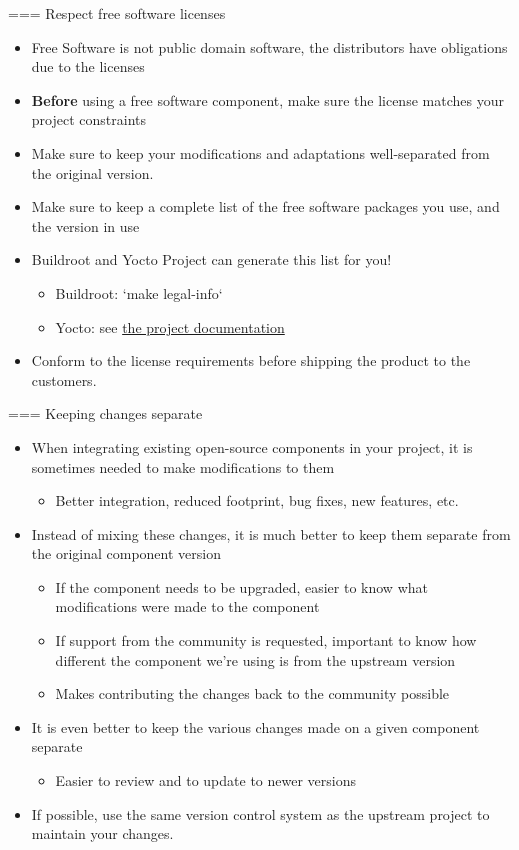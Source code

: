 === {Respect free software licenses}
  \begin{itemize}
  \item Free Software is not public domain software, the distributors
    have obligations due to the licenses
  \item {\bf Before} using a free software component, make sure the
    license matches your project constraints
  \item Make sure to keep your modifications and adaptations
    well-separated from the original version.
  \item Make sure to keep a complete list of the free software
    packages you use, and the version in use
  \item Buildroot and Yocto Project can generate this list for you!
    \begin{itemize}
    \item Buildroot: `make legal-info`
    \item Yocto: see
      \href{https://docs.yoctoproject.org/dev-manual/licenses.html\#maintaining-open-source-license-compliance-during-your-product-s-lifecycle}{the
        project documentation}
    \end{itemize}
  \item Conform to the license requirements before shipping the
    product to the customers.
  \end{itemize}


=== {Keeping changes separate}
  \begin{itemize}
  \item When integrating existing open-source components in your
    project, it is sometimes needed to make modifications to them
    \begin{itemize}
    \item Better integration, reduced footprint, bug fixes, new
      features, etc.
    \end{itemize}
  \item Instead of mixing these changes, it is much better to keep
    them separate from the original component version
    \begin{itemize}
    \item If the component needs to be upgraded, easier to know what
      modifications were made to the component
    \item If support from the community is requested, important to
      know how different the component we're using is from the
      upstream version
    \item Makes contributing the changes back to the community
      possible
    \end{itemize}
  \item It is even better to keep the various changes made on a given
    component separate
    \begin{itemize}
    \item Easier to review and to update to newer versions
    \end{itemize}
  \item If possible, use the same version control system as the upstream
    project to maintain your changes.
  \end{itemize}

